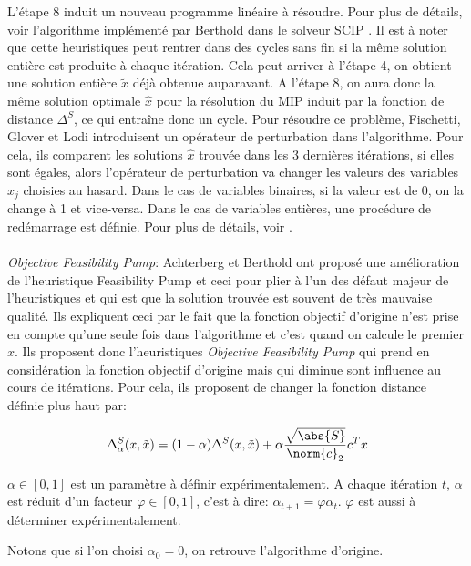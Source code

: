 \documentclass[12pt,a4paper,oneside]{book}
\theoremstyle{definition}
\begin{document}
	L'étape 8 induit un nouveau programme linéaire à résoudre. Pour plus de détails, voir l'algorithme implémenté par Berthold dans le solveur SCIP \cite{berthold2006}. Il est à noter que cette heuristiques peut rentrer dans des cycles sans fin si la même solution entière est produite à chaque itération. Cela peut arriver à l'étape 4, on obtient une solution entière $\tilde{x}$ déjà obtenue auparavant. A l'étape 8, on aura donc la même solution optimale $\hat{x}$ pour la résolution du MIP induit par la fonction de distance $\Delta^S$, ce qui entraîne donc un cycle. Pour résoudre ce problème, Fischetti, Glover et Lodi \cite{Fischetti2005} introduisent un opérateur de perturbation dans l'algorithme. Pour cela, ils comparent les solutions $\hat{x}$ trouvée dans les 3 dernières itérations, si elles sont égales, alors l'opérateur de perturbation va changer les valeurs des variables $\hat{x}_j$ choisies au hasard. Dans le cas de variables binaires, si la valeur est de 0, on la change à 1 et vice-versa. Dans le cas de variables entières, une procédure de redémarrage est définie. Pour plus de détails, voir \cite{bertacco2007feasibility}.

	\paragraph{}
	\textit{Objective Feasibility Pump}:
	Achterberg et Berthold ont proposé une amélioration de l'heuristique Feasibility Pump \cite{Achterberg2007} et ceci pour plier à l'un des défaut majeur de l'heuristiques et qui est que la solution trouvée est souvent de très mauvaise qualité. Ils expliquent ceci par le fait que la fonction objectif d'origine n'est prise en compte qu'une seule fois dans l'algorithme et c'est quand on calcule le premier $\hat{x}$. Ils proposent donc l'heuristiques \textit{Objective Feasibility Pump} qui prend en considération la fonction objectif d'origine mais qui diminue sont influence au cours de itérations. Pour cela, ils proposent de changer la fonction distance définie plus haut par:
	
	\[
		\Delta^S_\alpha(x,\tilde{x}) = (1-\alpha)\Delta^S(x,\tilde{x}) + \alpha \frac{\sqrt{\abs{S}}}{\norm{c}_2}c^T x
	\]
	
	$\alpha \in [0,1]$ est un paramètre à définir expérimentalement. A chaque itération $t$, $\alpha$ est réduit d'un facteur $\varphi \in [0,1]$, c'est à dire:
	$\alpha_{t+1} = \varphi \alpha_t$. $\varphi$ est aussi à déterminer expérimentalement.

	Notons que si l'on choisi $\alpha_0 = 0$, on retrouve l'algorithme d'origine.
	
\end{document}
